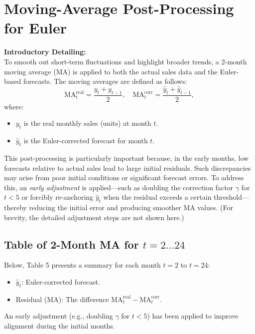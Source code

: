 \documentclass{article}
\begin{document}
\section{Moving-Average Post-Processing for Euler}
\label{sec:2monthMA}

\textbf{Introductory Detailing:}\\
To smooth out short-term fluctuations and highlight broader trends, a 2-month moving average (MA) is applied to both the actual sales data and the Euler-based forecasts. The moving averages are defined as follows:
\[
\text{MA}_t^{\mathrm{real}} = \frac{y_t + y_{t-1}}{2}, \quad \text{MA}_t^{\mathrm{corr}} = \frac{\hat{y}_t + \hat{y}_{t-1}}{2},
\]
where:
\begin{itemize}
    \item \(y_t\) is the real monthly sales (units) at month \(t\).
    \item \(\hat{y}_t\) is the Euler-corrected forecast for month \(t\).
\end{itemize}
This post-processing is particularly important because, in the early months, low forecasts relative to actual sales lead to large initial residuals. Such discrepancies may arise from poor initial conditions or significant forecast errors. To address this, an \emph{early adjustment} is applied—such as doubling the correction factor \(\gamma\) for \(t<5\) or forcibly re-anchoring \(\hat{y}_t\) when the residual exceeds a certain threshold—thereby reducing the initial error and producing smoother MA values. (For brevity, the detailed adjustment steps are not shown here.)

\subsection{Table of 2-Month MA for \(t=2 \ldots 24\)}
Below, Table 5 presents a summary for each month \(t=2\) to \(t=24\):
\begin{itemize}

    \item \(\hat{y}_t\): Euler-corrected forecast.
  
    \item Residual (MA): The difference \(\text{MA}_t^{\mathrm{real}} - \text{MA}_t^{\mathrm{corr}}\).
\end{itemize}
An early adjustment (e.g., doubling \(\gamma\) for \(t<5\)) has been applied to improve alignment during the initial months.
\end{document}
